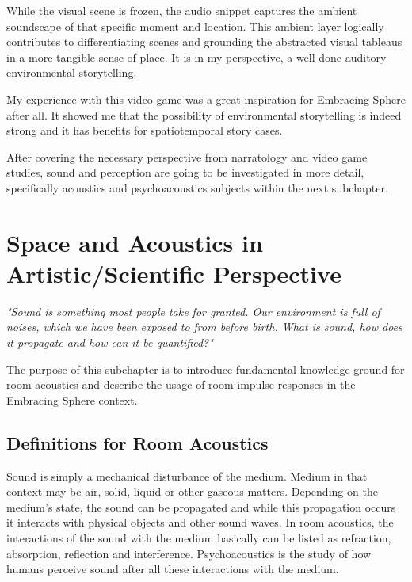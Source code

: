             While the visual scene is frozen, the audio snippet captures the ambient soundscape of that specific moment and location. This ambient layer logically contributes to differentiating scenes and grounding the abstracted visual tableaus in a more tangible sense of place. It is in my perspective, a well done auditory environmental storytelling.\par           

            My experience with this video game was a great inspiration for Embracing Sphere after all. It showed me that the possibility of environmental storytelling is indeed strong and it has benefits for spatiotemporal story cases.\par

            After covering the necessary perspective from narratology and video game studies, sound and perception are going to be investigated in more detail, specifically acoustics and psychoacoustics subjects within the next subchapter.
    \section{Space and Acoustics in Artistic/Scientific Perspective}
            \emph{"Sound is something most people take for granted. Our environment is full of noises, which we have been exposed to from before birth. What is sound, how does it propagate and how can it be quantified?"\cite{Acoustics_and_Psychophysics}}\par 

            The purpose of this subchapter is to introduce fundamental knowledge ground for room acoustics and describe the usage of room impulse responses in the Embracing Sphere context.\par
        \subsection{Definitions for Room Acoustics}
            Sound is simply a mechanical disturbance of the medium. Medium in that context may be air, solid, liquid or other gaseous matters. Depending on the medium's state, the sound can be propagated and while this propagation occurs it interacts with physical objects and other sound waves. In room acoustics, the interactions of the sound with the medium basically can be listed as refraction, absorption, reflection and interference. Psychoacoustics is the study of how humans perceive sound after all these interactions with the medium\cite{Acoustics_and_Psychophysics}.\par

